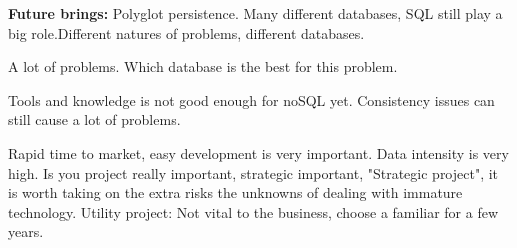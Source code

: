 \textbf{Future brings:}
Polyglot persistence. Many different databases, SQL still play a big role.Different natures of problems, different databases.

A lot of problems. Which database is the best for this problem. 

Tools and knowledge is not good enough for noSQL yet. Consistency issues can still cause a lot of problems.

Rapid time to market, easy development is very important. Data intensity is very high. Is you project really important, strategic important, "Strategic project", it is worth taking on the extra risks the unknowns of dealing with immature technology. Utility project: Not vital to the business, choose a familiar for a few years.



